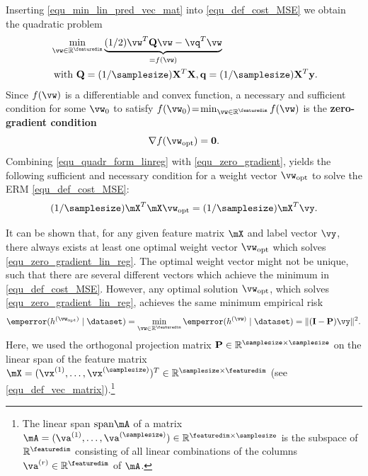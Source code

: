 \documentclass[12pt]{report}
\begin{document}
Inserting \eqref{equ_min_lin_pred_vec_mat} into \eqref{equ_def_cost_MSE} we obtain the quadratic problem 
\begin{align}
\label{equ_quadr_form_linreg}
& \min_{\vw \in \mathbb{R}^{\featuredim}} \underbrace{(1/2) \vw^{T} \mathbf{Q} \vw - \vq^{T}  \vw}_{= f(\vw)} \nonumber \\
& \mbox{ with } \mathbf{Q}= (1/\samplesize) \mathbf{X}^{T} \mathbf{X}, \mathbf{q} =(1/\samplesize) \mathbf{X}^{T} \mathbf{y}. 
\end{align} 
Since $f(\vw)$ is a differentiable and convex function, a necessary and sufficient condition for 
some $\vw_{0}$ to satisfy $f(\vw_{0})\!=\!\min_{\vw \in \mathbb{R}^{\featuredim}} f(\vw)$ is the 
{\bf zero-gradient condition} \cite[Sec. 4.2.3]{BoydConvexBook}
\begin{equation}
\label{equ_zero_gradient}
 \nabla f(\vw_{\rm opt}) = \mathbf{0}.
\end{equation} 
Combining \eqref{equ_quadr_form_linreg} with \eqref{equ_zero_gradient}, yields the following sufficient 
and necessary condition for a weight vector $\vw_{\rm opt}$ to solve the ERM \eqref{equ_def_cost_MSE}: 
\begin{equation}
\label{equ_zero_gradient_lin_reg}
(1/\samplesize) \mX^{T} \mX \vw_{\rm opt} = (1/\samplesize) \mX^{T} \vy.  
\end{equation} 

It can be shown that, for any given feature matrix $\mX$ and label vector $\vy$, there always 
exists at least one optimal weight vector $\vw_{\rm opt}$ which solves \eqref{equ_zero_gradient_lin_reg}. 
The optimal weight vector might not be unique, such that there are several different vectors 
which achieve the minimum in \eqref{equ_def_cost_MSE}. However, any optimal solution $\vw_{\rm opt}$, 
which solves \eqref{equ_zero_gradient_lin_reg}, achieves the same minimum empirical risk 
\begin{equation}
\label{equ_emp_risk_lin_proje}
\emperror(h^{(\vw_{\rm opt})} \mid \dataset) = \min_{\vw \in \mathbb{R}^{\featuredim}} \emperror(h^{(\vw)} \mid \dataset) = \|  (\mathbf{I}- \mathbf{P}) \vy \|^{2}.
\end{equation} 
Here, we used the orthogonal projection matrix $\mathbf{P} \in \mathbb{R}^{\samplesize \times \samplesize}$ on the linear span of the 
feature matrix $\mX = (\vx^{(1)},\ldots,\vx^{(\samplesize)})^{T} \in \mathbb{R}^{\samplesize \times \featuredim}$ (see \eqref{equ_def_vec_matrix}).\footnote{The linear span ${\rm span } \mA$ 
of a matrix $\mA=(\va^{(1)},\ldots,\va^{(\samplesize)}) \in \mathbb{R}^{\featuredim \times \samplesize}$ is the subspace of $\mathbb{R}^{\featuredim}$ consisting of 
all linear combinations of the columns $\va^{(r)} \in \mathbb{R}^{\featuredim}$ of $\mA$.} 
\end{document}
